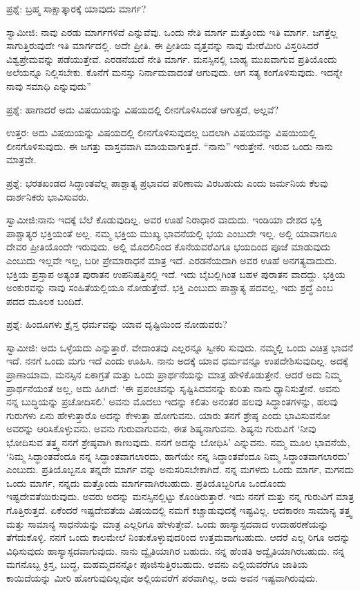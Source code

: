 ಪ್ರಶ್ನೆ: ಬ್ರಹ್ಮ ಸಾಕ್ಷಾತ್ಕಾರಕ್ಕೆ ಯಾವುದು ಮಾರ್ಗ?

ಸ್ವಾಮೀಜಿ: ನಾವು ಎರಡು ಮಾರ್ಗಗಳಿವೆ ಎನ್ನುವೆವು. ಒಂದು ನೇತಿ ಮಾರ್ಗ ಮತ್ತೊಂದು ಇತಿ ಮಾರ್ಗ. ಜಗತ್ತೆಲ್ಲ ಸಾಗುತ್ತಿರುವುದೇ ಇತಿ ಮಾರ್ಗದಲ್ಲಿ. ಅದೇ ಪ್ರೀತಿ. ಈ ಪ್ರೀತಿಯ ವೃತ್ತವನ್ನು ನಾವು ಮೇರೆಮೀರಿ ವಿಸ್ತರಿಸಿದರೆ ವಿಶ್ವಪ್ರೇಮವನ್ನು ಪಡೆಯುತ್ತೇವೆ. ಎರಡನೆಯದೆ ನೇತಿ ಮಾರ್ಗ. ಮನಸ್ಸಿನಲ್ಲಿ ಬಾಹ್ಯ ಮುಖವಾಗುವ ಪ್ರತಿಯೊಂದು ಅಲೆಯನ್ನೂ ನಿಲ್ಲಿಸಬೇಕು. ಕೊನೆಗೆ ಮನಸ್ಸು ನಿರ್ನಾಮವಾದಂತೆ ಆಗುವುದು. ಆಗ ಸತ್ಯ ಕಂಗೊಳಿಸುವುದು. ಇದನ್ನೇ ನಾವು ಸಮಾಧಿ ಎನ್ನುವುದು”

ಪ್ರಶ್ನೆ: ಹಾಗಾದರೆ ಅದು ವಿಷಯಿಯನ್ನು ವಿಷಯದಲ್ಲಿ ಲೀನಗೊಳಿಸಿದಂತೆ ಆಗುತ್ತದೆ, ಅಲ್ಲವೆ?

ಉತ್ತರ: ಅದು ವಿಷಯಿಯನ್ನು ವಿಷಯದಲ್ಲಿ ಲೀನಗೊಳಿಸುವುದಲ್ಲ ಬದಲಾಗಿ ವಿಷಯವನ್ನು ವಿಷಯಿಯಲ್ಲಿ ಲೀನಗೊಳಿಸುವುದು. ಈ ಜಗತ್ತು ವಾಸ್ತವವಾಗಿ ಮಾಯವಾಗುತ್ತದೆ. “ನಾನು” ಇರುತ್ತೇನೆ. ಇರುವ ಒಂದು ನಾನು ಮಾತ್ರವೇ.

ಪ್ರಶ್ನೆ: ಭರತಖಂಡದ ಸಿದ್ಧಾಂತವೆಲ್ಲ ಪಾಶ್ಚಾತ್ಯ ಪ್ರಭಾವದ ಪರಿಣಾಮ ವಿರಬಹುದು ಎಂದು ಜರ್ಮನಿಯ ಕೆಲವು ದಾರ್ಶನಿಕರು ಭಾವಿಸುವರು.

ಸ್ವಾಮೀಜಿ:ನಾನು ಇದಕ್ಕೆ ಬೆಲೆ ಕೊಡುವುದಿಲ್ಲ. ಅವರ ಊಹೆ ನಿರಾಧಾರ ವಾದುದು. ಇಂಡಿಯಾ ದೇಶದ ಭಕ್ತಿ ಪಾಶ್ಚಾತ್ಯರ ಭಕ್ತಿಯಂತೆ ಅಲ್ಲ. ನಮ್ಮ ಭಕ್ತಿಯ ಮುಖ್ಯ ಭಾವನೆಯಲ್ಲಿ ಭಯ ಎಂಬುದೇ ಇಲ್ಲ. ಅಲ್ಲಿ ಯಾವಾಗಲೂ ದೇವರ ಪ್ರೀತಿಯೊಂದೇ ಇರುವುದು. ಅಲ್ಲಿ ಮೊದಲಿನಿಂದ ಕೊನೆಯವರೆವಿಗೂ ಭಯದಿಂದ ಪೂಜೆ ಮಾಡುವುದು ಎಂಬುದು ಇಲ್ಲವೇ ಇಲ್ಲ, ಬರೀ ಪ್ರೇಮಾರಾಧನೆ ಮಾತ್ರ ಇದೆ. ಎರಡನೆಯದಾಗಿ ಅವರ ಊಹೆ ಅನಗತ್ಯವಾದುದು. ಭಕ್ತಿಯ ಪ್ರಸ್ತಾಪ ಅತ್ಯಂತ ಪುರಾತನ ಉಪನಿಷತ್ತಿನಲ್ಲಿ ಇದೆ. ಇದು ಬೈಬಲ್ಲಿಗಿಂತ ಬಹಳ ಪುರಾತನ ವಾದದ್ದು. ಭಕ್ತಿಯ ಅಂಕುರವನ್ನು ನಾವು ಸಂಹಿತೆಯಲ್ಲಿಯೂ ನೋಡುತ್ತೇವೆ. ಭಕ್ತಿ ಎಂಬುದು ಪಾಶ್ಚಾತ್ಯ ಪದವಲ್ಲ, ಇದು ಶ್ರದ್ಧೆ ಎಂಬ ಪದದ ಮೂಲಕ ಬಂದಿದೆ.

ಪ್ರಶ್ನೆ: ಹಿಂದೂಗಳು ಕ್ರೈಸ್ತ ಧರ್ಮವನ್ನು ಯಾವ ದೃಷ್ಟಿಯಿಂದ ನೋಡುವರು?

ಸ್ವಾಮೀಜಿ: ಅದು ಒಳ್ಳೆಯದು ಎನ್ನುತ್ತಾರೆ. ವೇದಾಂತವು ಎಲ್ಲರನ್ನೂ ಸ್ವೀಕರಿ ಸುವುದು. ನಮ್ಮಲ್ಲಿ ಒಂದು ವಿಚಿತ್ರ ಭಾವನೆ ಇದೆ. ನನಗೆ ಒಂದು ಮಗು ಇದೆ ಎಂದು ಊಹಿಸಿ. ನಾನು ಅದಕ್ಕೆ ಯಾವ ಧರ್ಮವನ್ನೂ ಉಪದೇಶಿಸುವುದಿಲ್ಲ. ಅದಕ್ಕೆ ಪ್ರಾಣಾಯಾಮ, ಮನಸ್ಸಿನ ಏಕಾಗ್ರತೆ ಮತ್ತು ಒಂದು ಪ್ರಾರ್ಥನೆಯನ್ನು ಮಾತ್ರ ಹೇಳಿಕೊಡುತ್ತೇನೆ. ಆದರೆ ಅದು ನಿಮ್ಮ ಪ್ರಾರ್ಥನೆಯಂತೆ ಅಲ್ಲ, ಅದು ಹೀಗಿದೆ: ‘ಈ ಪ್ರಪಂಚವನ್ನು ಸೃಷ್ಟಿಸಿದವನನ್ನು ಕುರಿತು ನಾನು ಧ್ಯಾನಿಸುತ್ತೇನೆ. ಅವನು ನನ್ನ ಬುದ್ಧಿಯನ್ನು ಪ್ರಚೋದಿಸಲಿ.’ ಅವನು ಮೊದಲು ಇದನ್ನು ಕಲಿತು ಅನಂತರ ಹಲವು ಸಿದ್ಧಾಂತಗಳನ್ನು, ಹಲವು ಗುರುಗಳು ಏನು ಹೇಳುತ್ತಾರೊ ಅದನ್ನು ಕೇಳುತ್ತಾ ಹೋಗುವನು. ಯಾರು ತನಗೆ ಶ್ರೇಷ್ಠ ಎಂದು ಭಾವಿಸುವನೋ ಅವರನ್ನು ಆರಿಸಿಕೊಳ್ಳುವನು. ಅವನು ಗುರುವಾಗುವನು, ಈತ ಶಿಷ್ಯನಾಗುವನು. ಶಿಷ್ಯನು ಗುರುವಿಗೆ ‘ನೀವು ಭೋದಿಸುವ ತತ್ತ್ವ ನನಗೆ ಶ್ರೇಷ್ಠವಾಗಿ ಕಾಣುವುದು. ನನಗೆ ಅದನ್ನು ಬೋಧಿಸಿ’ ಎನ್ನುವನು. ನಮ್ಮ ಮೂಲ ಭಾವನೆಯೆ, ‘ನಿಮ್ಮ ಸಿದ್ಧಾಂತವೆಂದೂ ನನ್ನ ಸಿದ್ಧಾಂತವಾಗಲಾರದು, ಹಾಗೆಯೇ ನನ್ನ ಸಿದ್ಧಾಂತವೆಂದೂ ನಿಮ್ಮ ಸಿದ್ಧಾಂತವಾಗಲಾರದು’ ಎಂಬುದು. ಪ್ರತಿಯೊಬ್ಬನೂ ತನ್ನದೇ ಮಾರ್ಗ ವನ್ನು ಅನುಸರಿಸಬೇಕಾಗಿದೆ. ನನ್ನ ಮಗಳದು ಒಂದು ಮಾರ್ಗ, ಮಗನದು ಒಂದು ಮಾರ್ಗ, ನನ್ನದು ಮತ್ತೊಂದು ಮಾರ್ಗವಾಗಿರಬಹುದು. ಪ್ರತಿಯೊಬ್ಬರಿಗೂ ಒಂದೊಂದು ಇಷ್ಟದೇವತೆಯಿರುವುದು. ಅವರು ಅದನ್ನು ಮನಸ್ಸಿನಲ್ಲಿಟ್ಟು ಕೊಂಡಿರುತ್ತಾರೆ. ಇದು ನನಗೆ ಮತ್ತು ನನ್ನ ಗುರುವಿಗೆ ಮಾತ್ರ ಗೊತ್ತಿರುತ್ತದೆ. ಏಕೆಂದರೆ ಇಷ್ಟದೇವತೆಯ ವಿಷಯದಲ್ಲಿ ನಮಗೆ ಕಚ್ಚಾಡುವುದಕ್ಕೆ ಇಷ್ಟವಿಲ್ಲ. ಆದಕಾರಣ ಸಾಮಾನ್ಯ ತತ್ತ್ವ ಮತ್ತು ಸಾಮಾನ್ಯ ಸಾಧನೆಯನ್ನು ಮಾತ್ರ ಎಲ್ಲರಿಗೂ ಹೇಳುತ್ತೇವೆ. ಒಂದು ಹಾಸ್ಯಾಸ್ಪದವಾದ ಉದಾಹರಣೆಯನ್ನು ತೆಗೆದುಕೊಳ್ಳಿ. ನನಗೆ ಒಂದು ಕಾಲಮೇಲೆ ನಿಂತುಕೊಳ್ಳುವುದರಿಂದ ಉತ್ತಮವಾಗಬಹುದು. ಆದರೆ ಎಲ್ಲ ರಿಗೂ ಅದನ್ನು ವಿಧಿಸುವುದು ಹಾಸ್ಯಾಸ್ಪದವಾಗುವುದು. ನಾನು ದ್ವೈತಿಯಾಗಿರ ಬಹುದು. ನನ್ನ ಹೆಂಡತಿ ಅದ್ವೈತಿಯಾಗಿರಬಹುದು. ನನ್ನ ಮಗನೊಬ್ಬ ಕ್ರಿಸ್ತ, ಬುದ್ಧ, ಮಹಮ್ಮದನನ್ನೋ ಪೂಜಿಸುತ್ತಿರಬಹುದು. ಅವನು ಎಲ್ಲಿಯವರೆಗೂ ಜಾತಿಯ ಕಾಯಿದೆಯನ್ನು ಮೀರಿ ಹೋಗುವುದಿಲ್ಲವೋ ಅಲ್ಲಿಯವರೆಗೆ ಪರವಾಗಿಲ್ಲ, ಅದು ಅವನ ಇಷ್ಟವಾಗಿರುವುದು.

